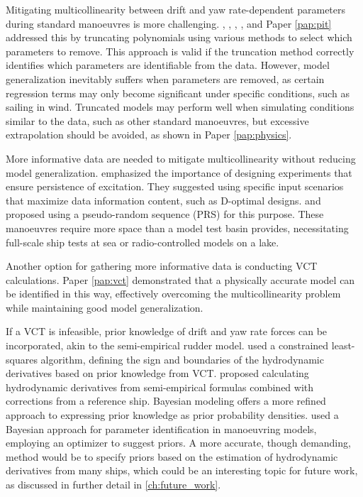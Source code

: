 Mitigating multicollinearity between drift and yaw rate-dependent parameters during standard manoeuvres is more challenging. \textcite{abkowitzMEASUREMENTHYDRODYNAMICCHARACTERISTICS1980}, \textcite{luoParameterIdentificationShip2016}, \textcite{xuUncertaintyAnalysisHydrodynamic2019}, \textcite{liuPhysicsinformedIdentificationMarine2024}, and Paper \ref{pap:pit} addressed this by truncating polynomials using various methods to select which parameters to remove. This approach is valid if the truncation method correctly identifies which parameters are identifiable from the data. However, model generalization inevitably suffers when parameters are removed, as certain regression terms may only become significant under specific conditions, such as sailing in wind. Truncated models may perform well when simulating conditions similar to the data, such as other standard manoeuvres, but excessive extrapolation should be avoided, as shown in Paper \ref{pap:physics}.

More informative data are needed to mitigate multicollinearity without reducing model generalization. \textcite{yoonIdentificationHydrodynamicCoefficients2003} emphasized the importance of designing experiments that ensure persistence of excitation. They suggested using specific input scenarios that maximize data information content, such as D-optimal designs. \textcite{wangOptimalDesignExcitation2020} and \textcite{millerShipModelIdentification2021} proposed using a pseudo-random sequence (PRS) for this purpose. These manoeuvres require more space than a model test basin provides, necessitating full-scale ship tests at sea or radio-controlled models on a lake.

Another option for gathering more informative data is conducting VCT calculations. Paper \ref{pap:vct} demonstrated that a physically accurate model can be identified in this way, effectively overcoming the multicollinearity problem while maintaining good model generalization.

If a VCT is infeasible, prior knowledge of drift and yaw rate forces can be incorporated, akin to the semi-empirical rudder model. \textcite{chillcceDatadrivenSystemIdentification2023} used a constrained least-squares algorithm, defining the sign and boundaries of the hydrodynamic derivatives based on prior knowledge from VCT. \textcite{taimuri6DoFManeuveringModel2020} proposed calculating hydrodynamic derivatives from semi-empirical formulas combined with corrections from a reference ship. Bayesian modeling offers a more refined approach to expressing prior knowledge as prior probability densities. \textcite{xueHydrodynamicParameterIdentification2020} used a Bayesian approach for parameter identification in manoeuvring models, employing an optimizer to suggest priors. A more accurate, though demanding, method would be to specify priors based on the estimation of hydrodynamic derivatives from many ships, which could be an interesting topic for future work, as discussed in further detail in \autoref{ch:future_work}.
